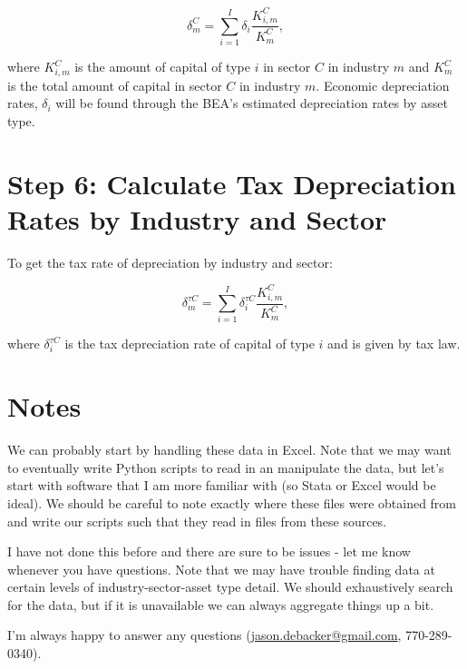 \documentclass[article,11pt,letterpaper,fleqn]{article}
\theoremstyle{definition}
\numberwithin{equation}{section}
\begin{document}
\begin{equation}
\label{eqn:econ_deprec}
\delta^{C}_{m}=\sum_{i=1}^{I}\delta_{i}\frac{K^{C}_{i,m}}{K^{C}_{m}},
\end{equation}

\noindent\noindent where $K^{C}_{i,m}$ is the amount of capital of type $i$ in sector $C$ in industry $m$ and $K^{C}_{m}$ is the total amount of capital in sector $C$ in industry $m$.  Economic depreciation rates, $\delta_{i}$ will be found through the BEA's estimated depreciation rates by asset type.

\section*{Step 6: Calculate Tax Depreciation Rates by Industry and Sector}
\label{sec:step6}

 To get the  tax rate of depreciation by industry and sector: 

\begin{equation}
\label{eqn:tax_deprec}
\delta^{\tau C}_{m}=\sum_{i=1}^{I}\delta^{\tau C}_{i}\frac{K^{C}_{i,m}}{K^{C}_{m}},
\end{equation}

\noindent\noindent where $\delta^{\tau C}_{i}$ is the tax depreciation rate  of capital of type $i$ and is given by tax law.

\section*{Notes}
\label{sec:notes}

We can probably start by handling these data in Excel.  Note that we may want to eventually write Python scripts to read in an manipulate the data, but let's start with software that I am more familiar with (so Stata or Excel would be ideal).  We should be careful to note exactly where these files were obtained from and write our scripts such that they read in files from these sources.

I have not done this before and there are sure to be issues - let me know whenever you have questions.  Note that we may have trouble finding data at certain levels of industry-sector-asset type detail.  We should exhaustively search for the data, but if it is unavailable we can always aggregate things up a bit.

I'm always happy to answer any questions (\href{mailto:jason.debacker@gmail.com}{jason.debacker@gmail.com}, 770-289-0340).  


\end{document}

